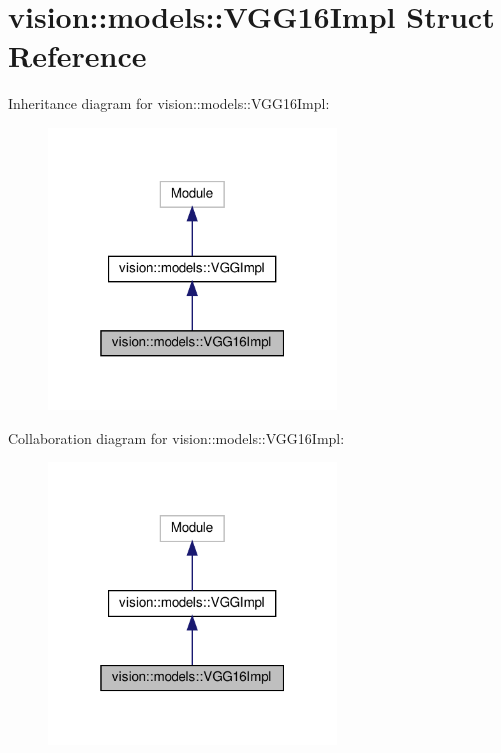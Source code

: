 \hypertarget{structvision_1_1models_1_1VGG16Impl}{}\section{vision\+:\+:models\+:\+:V\+G\+G16\+Impl Struct Reference}
\label{structvision_1_1models_1_1VGG16Impl}


Inheritance diagram for vision\+:\+:models\+:\+:V\+G\+G16\+Impl\+:
\nopagebreak
\begin{figure}[H]
\begin{center}
\leavevmode
\includegraphics[width=217pt]{structvision_1_1models_1_1VGG16Impl__inherit__graph}
\end{center}
\end{figure}


Collaboration diagram for vision\+:\+:models\+:\+:V\+G\+G16\+Impl\+:
\nopagebreak
\begin{figure}[H]
\begin{center}
\leavevmode
\includegraphics[width=217pt]{structvision_1_1models_1_1VGG16Impl__coll__graph}
\end{center}
\end{figure}
